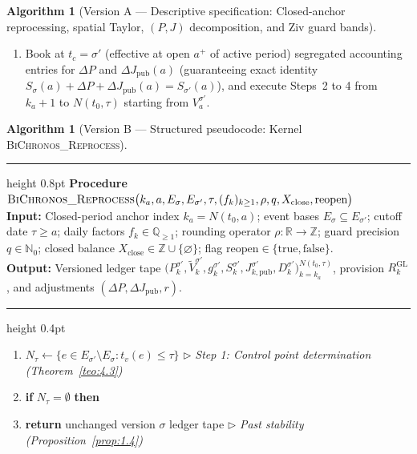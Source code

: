 \documentclass[11pt, a4paper]{article}
\theoremstyle{definition}
\newtheorem{algoritmo}[definicao]{Algorithm}
\theoremstyle{plain}
\theoremstyle{remark}
\begin{document}
\begin{algoritmo}[Version A — Descriptive specification: Closed-anchor reprocessing, spatial Taylor, \texorpdfstring{$(P, J)$}{(P, J)} decomposition, and Ziv guard bands]
\begin{enumerate}[label=\textbf{\arabic*.}]
\begin{enumerate}[label=(\alph*)]
        \[
        \Delta J_{\text{pub}}(a) := \big(S_{\sigma'}(a) - S_\sigma(a)\big) - \Delta P \in \mathbb{Z}.
        \]
        \item Book at $t_c = \sigma'$ (effective at open $a^+$ of active period) segregated accounting entries for $\Delta P$ and $\Delta J_{\text{pub}}(a)$ (guaranteeing exact identity $S_\sigma(a) + \Delta P + \Delta J_{\text{pub}}(a) = S_{\sigma'}(a)$), and execute Steps~2 to 4 from $k_a + 1$ to $N(t_0, \tau)$ starting from $V_a^{\sigma'}$.
    \end{enumerate}
\end{enumerate}
\end{algoritmo}

\begin{algoritmo}[Version B — Structured pseudocode: Kernel \textsc{BiChronos\_Reprocess}]\label{alg:5.14b}
\leavevmode\par\vspace{0.2em}
\hrule height 0.8pt
\vspace{0.3em}
\noindent\textbf{Procedure} $\textsc{BiChronos\_Reprocess}\big(k_a, a, E_\sigma, E_{\sigma'}, \tau, (f_k)_{k\ge 1}, \rho, q, X_{\text{close}}, \text{reopen}\big)$\\
\textbf{Input:} Closed-period anchor index $k_a = N(t_0, a)$; event bases $E_\sigma \subseteq E_{\sigma'}$; cutoff date $\tau \ge a$; daily factors $f_k \in \mathbb{Q}_{\ge 1}$; rounding operator $\rho : \mathbb{R} \to \mathbb{Z}$; guard precision $q \in \mathbb{N}_0$; closed balance $X_{\text{close}} \in \mathbb{Z} \cup \{\varnothing\}$; flag $\text{reopen} \in \{\text{true}, \text{false}\}$.\\
\textbf{Output:} Versioned ledger tape $\big(P_k^{\sigma'}, \tilde{V}_k^{\sigma'}, g_k^{\sigma'}, S_k^{\sigma'}, J_{k,\text{pub}}^{\sigma'}, D_k^{\sigma'}\big)_{k=k_a}^{N(t_0, \tau)}$, provision $R_k^{\text{GL}}$, and adjustments $(\Delta P, \Delta J_{\text{pub}}, r)$.
\vspace{0.2em}
\hrule height 0.4pt
\begin{enumerate}[label=\footnotesize\textbf{\arabic*:}, leftmargin=2.2em, itemsep=0.15em, topsep=0.3em]
    \item $N_\tau \leftarrow \{e \in E_{\sigma'} \setminus E_\sigma : t_v(e) \le \tau\}$ \hfill $\triangleright$ \emph{Step 1: Control point determination (Theorem~\ref{teo:4.3})}
    \item \textbf{if} $N_\tau = \emptyset$ \textbf{then}
    \item \hspace{1.2em} \textbf{return} unchanged version $\sigma$ ledger tape \hfill $\triangleright$ \emph{Past stability (Proposition~\ref{prop:1.4})}

\end{enumerate}
\end{algoritmo}
\end{document}
